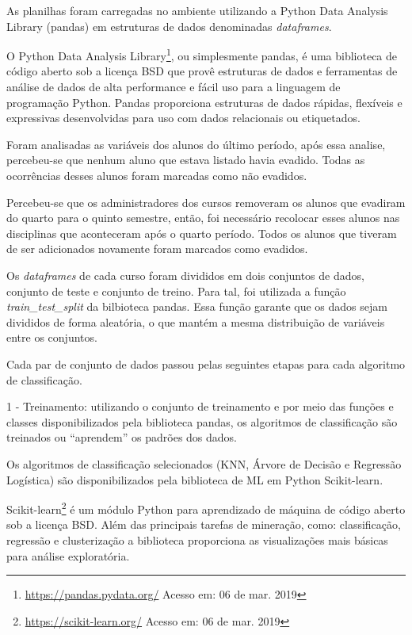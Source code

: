As planilhas foram carregadas no ambiente utilizando a Python Data Analysis
Library (pandas) em estruturas de dados denominadas \textit{dataframes}.

O Python Data Analysis Library\footnote{\url{https://pandas.pydata.org/} Acesso
em: 06 de mar. 2019}, ou simplesmente pandas, é uma biblioteca de código aberto
sob a licença BSD que provê estruturas de dados e ferramentas de análise de
dados de alta performance e fácil uso para a linguagem de programação Python.
Pandas proporciona estruturas de dados rápidas, flexíveis e expressivas
desenvolvidas para uso com dados relacionais ou etiquetados.

Foram analisadas as variáveis dos alunos do último período, após essa analise,
percebeu-se que nenhum aluno que estava listado havia evadido. Todas as
ocorrências desses alunos foram marcadas como não evadidos.

Percebeu-se que os administradores dos cursos removeram os alunos que evadiram
do quarto para o quinto semestre, então, foi necessário recolocar esses alunos
nas disciplinas que aconteceram após o quarto período. Todos os alunos que
tiveram de ser adicionados novamente foram marcados como evadidos.

Os \textit{dataframes} de cada curso foram divididos em dois conjuntos de dados,
conjunto de teste e conjunto de treino. Para tal, foi utilizada a função
\textit{train\_test\_split} da bilbioteca pandas. Essa função garante que os
dados sejam divididos de forma aleatória, o que mantém a mesma distribuição de
variáveis entre os conjuntos.

Cada par de conjunto de dados passou pelas seguintes etapas para cada algoritmo de
classificação.

1 - Treinamento: utilizando o conjunto de treinamento e por meio das funções e
classes disponibilizados pela biblioteca pandas, os algoritmos de classificação
são treinados ou ``aprendem'' os padrões dos dados.

Os algoritmos de classificação selecionados (KNN, Árvore de Decisão e Regressão
Logística) são disponibilizados pela biblioteca de ML em Python Scikit-learn.

Scikit-learn\footnote{\url{https://scikit-learn.org/} Acesso em: 06 de mar.
2019} é um módulo Python para aprendizado de máquina de código aberto sob a
licença BSD. Além das principais tarefas de mineração, como: classificação,
regressão e clusterização a biblioteca proporciona as visualizações mais básicas
para análise exploratória.

